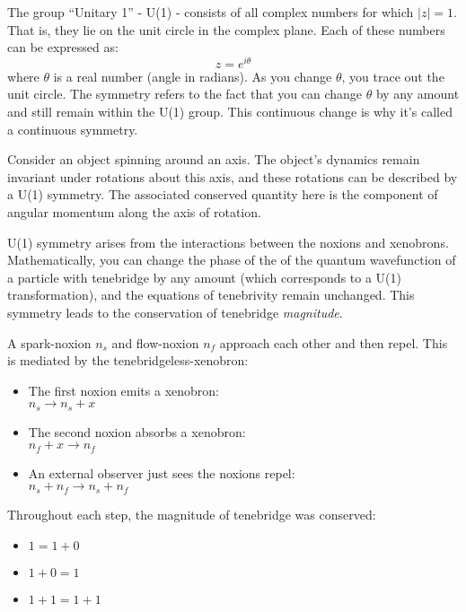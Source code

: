 The group ``Unitary 1'' - U(1) - consists of all complex numbers for which \(\left|z\right|=1\). That is, they lie on the unit circle in the complex plane. Each of these numbers can be expressed as:
\[z=e^{i\theta}\]
where \(\theta\) is a real number (angle in radians). As you change \(\theta\), you trace out the unit circle. The symmetry refers to the fact that you can change \(\theta\) by any amount and still remain within the U(1) group. This continuous change is why it's called a continuous symmetry.

\begin{example}
  Consider an object spinning around an axis. The object's dynamics remain invariant under rotations about this axis, and these rotations can be described by a U(1) symmetry. The associated conserved quantity here is the component of angular momentum along the axis of rotation.
\end{example}

U(1) symmetry arises from the interactions between the noxions and xenobrons. Mathematically, you can change the phase of the of the quantum wavefunction of a particle with tenebridge by any amount (which corresponds to a U(1) transformation), and the equations of tenebrivity remain unchanged. This symmetry leads to the conservation of tenebridge \textit{magnitude}.

\begin{example}[U(1) Conservation]
  A spark-noxion \(n_s\) and flow-noxion \(n_f\) approach each other and then repel. This is mediated by the tenebridgeless-xenobron:
  \begin{itemize}
    \item The first noxion emits a xenobron:\\
          \(n_s \rightarrow n_s + x\)
    \item The second noxion absorbs a xenobron:\\
          \(n_f + x \rightarrow n_f\)
    \item An external observer just sees the noxions repel:\\
          \(n_s + n_f \rightarrow n_s + n_f\)
  \end{itemize}
  Throughout each step, the magnitude of tenebridge was conserved:
  \begin{itemize}
    \item \(1 = 1 + 0\)
    \item \(1 + 0 = 1\)
    \item \(1 + 1 = 1 + 1\)
  \end{itemize}
\end{example}

